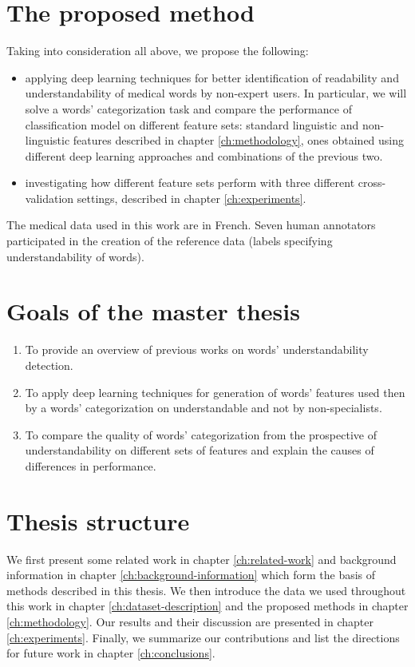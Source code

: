 \section{The proposed method}
Taking into consideration all above, we propose the following:
\begin{itemize}
    \item applying deep learning techniques for better identification of readability and understandability of medical words by non-expert users. In particular, we will solve a words' categorization task and compare the performance of classification model on different feature sets: standard linguistic and non-linguistic features described in chapter \ref{ch:methodology}, ones obtained using different deep learning approaches and combinations of the previous two.
    \item investigating how different feature sets perform with three different cross-validation settings, described in chapter \ref{ch:experiments}. 
\end{itemize}
The medical data used in this work are in French. Seven human annotators participated in the creation of the reference data (labels specifying understandability of words).

\section{Goals of the master thesis}
\begin{enumerate}
    \item To provide an overview of previous works on words' understandability detection.
    \item To apply deep learning techniques for generation of words' features used then by a words' categorization on understandable and not by non-specialists.
    \item To compare the quality of words' categorization from the prospective of understandability on different sets of features and explain the causes of differences in performance.
\end{enumerate}

\section{Thesis structure}
We first present some related work in chapter \ref{ch:related-work} and background information in chapter \ref{ch:background-information} which form the basis of methods described in this thesis. We then introduce the data we used throughout this work in chapter \ref{ch:dataset-description} and the proposed methods in chapter \ref{ch:methodology}. Our results and their discussion are presented in chapter \ref{ch:experiments}. Finally, we summarize our contributions and list the directions for future work in chapter \ref{ch:conclusions}.